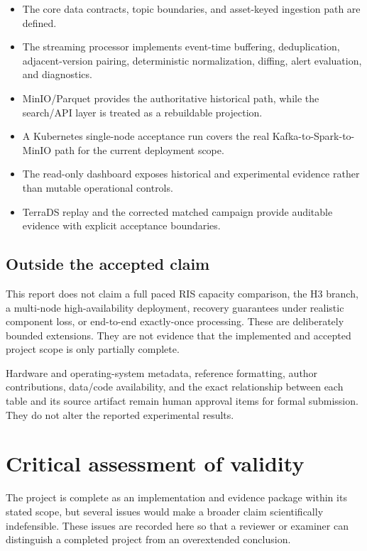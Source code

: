 \documentclass[a4paper,11pt]{article}
\begin{document}
\begin{itemize}
    \item The core data contracts, topic boundaries, and asset-keyed ingestion path are defined.
    \item The streaming processor implements event-time buffering, deduplication, adjacent-version pairing, deterministic normalization, diffing, alert evaluation, and diagnostics.
    \item MinIO/Parquet provides the authoritative historical path, while the search/API layer is treated as a rebuildable projection.
    \item A Kubernetes single-node acceptance run covers the real Kafka-to-Spark-to-MinIO path for the current deployment scope.
    \item The read-only dashboard exposes historical and experimental evidence rather than mutable operational controls.
    \item TerraDS replay and the corrected matched campaign provide auditable evidence with explicit acceptance boundaries.
\end{itemize}

\subsection{Outside the accepted claim}

This report does not claim a full paced RIS capacity comparison, the H3 branch, a multi-node high-availability deployment, recovery guarantees under realistic component loss, or end-to-end exactly-once processing. These are deliberately bounded extensions. They are not evidence that the implemented and accepted project scope is only partially complete.

Hardware and operating-system metadata, reference formatting, author contributions, data/code availability, and the exact relationship between each table and its source artifact remain human approval items for formal submission. They do not alter the reported experimental results.

\section{Critical assessment of validity}

The project is complete as an implementation and evidence package within its stated scope, but several issues would make a broader claim scientifically indefensible. These issues are recorded here so that a reviewer or examiner can distinguish a completed project from an overextended conclusion.
\end{document}

